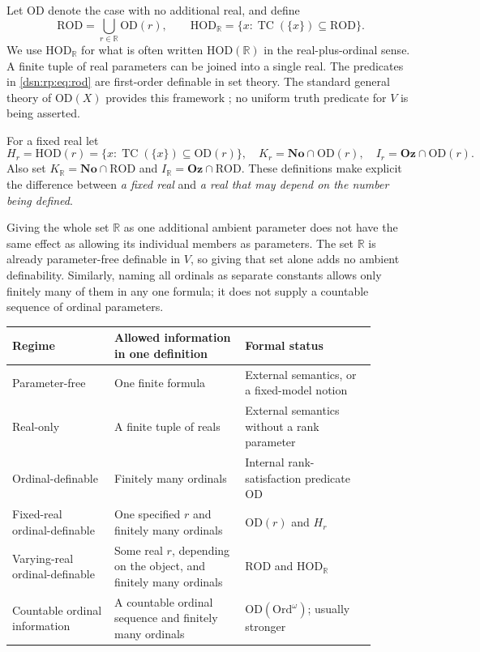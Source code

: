 \documentclass[11pt,a4paper]{article}
\numberwithin{equation}{section}
\theoremstyle{definition}
\theoremstyle{remark}
\newcommand{\No}{\mathbf{No}}
\newcommand{\Oz}{\mathbf{Oz}}
\newcommand{\Ord}{\mathrm{Ord}}
\newcommand{\OD}{\mathrm{OD}}
\newcommand{\HOD}{\mathrm{HOD}}
\newcommand{\R}{\mathbb R}
\newcommand{\TC}{\operatorname{TC}}
\newcommand{\ROD}{\mathrm{ROD}}
\newcommand{\HR}{\HOD_{\R}}
\newcommand{\KR}{K_{\R}}
\newcommand{\IR}{I_{\R}}
\begin{document}
Let $\OD$ denote the case with no additional real, and define
\begin{equation}\label{dsn:rp:eq:rod}
 \ROD=\bigcup_{r\in\R}\OD(r),\qquad
 \HR=\{x:\TC(\{x\})\subseteq\ROD\}.
\end{equation}
We use $\HR$ for what is often written $\HOD(\R)$ in the
real-plus-ordinal sense. A finite tuple of real parameters can be joined
into a single real. The predicates in \eqref{dsn:rp:eq:rod} are first-order
definable in set theory. The standard general theory of $\OD(X)$ provides
this framework \cite{DoraisHamkins}; no uniform truth predicate for $V$
is being asserted.

For a fixed real let
\[
 H_r=\HOD(r)=\{x:\TC(\{x\})\subseteq\OD(r)\},\quad
 K_r=\No\cap\OD(r),\quad I_r=\Oz\cap\OD(r).
\]
Also set $\KR=\No\cap\ROD$ and $\IR=\Oz\cap\ROD$. These definitions
make explicit the difference between \emph{a fixed real} and \emph{a
real that may depend on the number being defined}.

Giving the whole set $\R$ as one additional ambient parameter does not
have the same effect as allowing its individual members as parameters.
The set $\R$ is already parameter-free definable in $V$, so giving that
set alone adds no ambient definability. Similarly, naming all ordinals
as separate constants allows only finitely many of them in any one
formula; it does not supply a countable sequence of ordinal parameters.

\begin{center}
\small
\begin{tabular}{>{\raggedright\arraybackslash}p{0.25\linewidth}>{\raggedright\arraybackslash}p{0.32\linewidth}>{\raggedright\arraybackslash}p{0.32\linewidth}}
\toprule
Regime & Allowed information in one definition & Formal status\\
\midrule
Parameter-free & One finite formula & External semantics, or a fixed-model notion\\
Real-only & A finite tuple of reals & External semantics without a rank parameter\\
Ordinal-definable & Finitely many ordinals & Internal rank-satisfaction predicate $\OD$\\
Fixed-real ordinal-definable & One specified $r$ and finitely many ordinals & $\OD(r)$ and $H_r$\\
Varying-real ordinal-definable & Some real $r$, depending on the object, and finitely many ordinals & $\ROD$ and $\HR$\\
Countable ordinal information & A countable ordinal sequence and finitely many ordinals & $\OD(\Ord^\omega)$; usually stronger\\
\bottomrule
\end{tabular}
\end{center}
\end{document}
